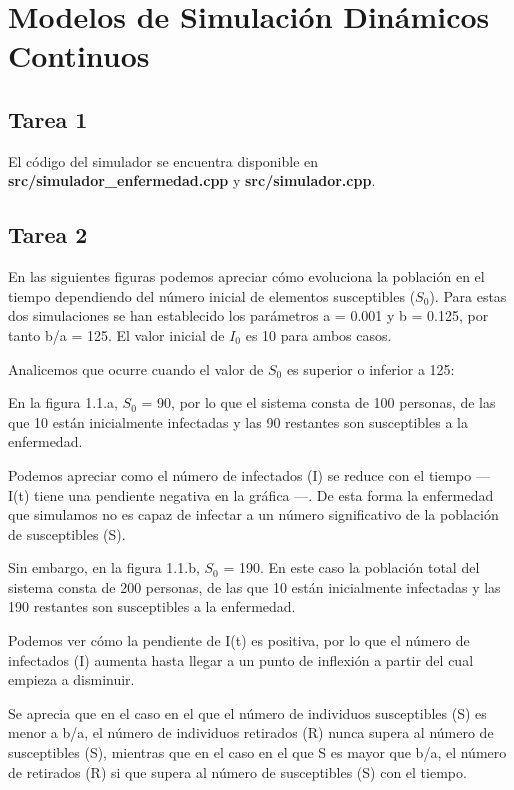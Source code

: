 \chapter{Modelos de Simulación Dinámicos Continuos}

\section{Tarea 1}

El código del simulador se encuentra disponible en \textbf{src/simulador\_enfermedad.cpp} y \textbf{src/simulador.cpp}.

\section{Tarea 2}

En las siguientes figuras podemos apreciar cómo evoluciona la población en el tiempo dependiendo del número inicial de elementos susceptibles ($S_0$).
Para estas dos simulaciones se han establecido los parámetros a = 0.001 y b = 0.125, por tanto b/a = 125. El valor inicial de $I_0$ es 10 para ambos casos.

Analicemos que ocurre cuando el valor de $S_0$ es superior o inferior a 125:

En la figura 1.1.a, $S_0$ = 90, por lo que el sistema consta de 100 personas, de las que 10 están inicialmente infectadas y las 90 restantes son susceptibles a la enfermedad.

Podemos apreciar como el número de infectados (I) se reduce con el tiempo --- I(t) tiene una pendiente negativa en la gráfica ---. De esta forma la enfermedad que simulamos no es capaz de infectar a un número significativo de la población de susceptibles (S).

Sin embargo, en la figura 1.1.b, $S_0$ = 190. En este caso la población total del sistema consta de 200 personas, de las que 10 están inicialmente infectadas y las 190 restantes son susceptibles a la enfermedad.

Podemos ver cómo la pendiente de I(t) es positiva, por lo que el número de infectados (I) aumenta hasta llegar a un punto de inflexión a partir del cual empieza a disminuir.

Se aprecia que en el caso en el que el número de individuos susceptibles (S) es menor a b/a, el número de individuos retirados (R) nunca supera al número de susceptibles (S), mientras que en el caso en el que S es mayor que b/a, el número de retirados (R) si que supera al número de susceptibles (S) con el tiempo.



